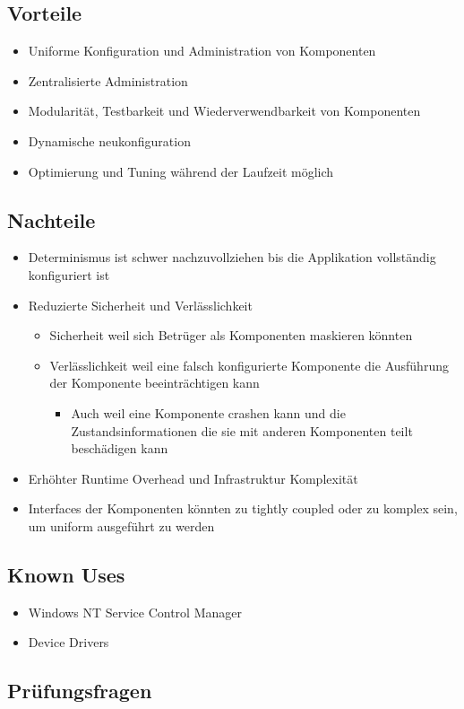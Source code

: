 \subsection{Vorteile}

\begin{itemize}
	\item Uniforme Konfiguration und Administration von Komponenten
	\item Zentralisierte Administration
	\item Modularität, Testbarkeit und Wiederverwendbarkeit von Komponenten
	\item Dynamische neukonfiguration
	\item Optimierung und Tuning während der Laufzeit möglich
\end{itemize}

\subsection{Nachteile}

\begin{itemize}
	\item Determinismus ist schwer nachzuvollziehen bis die Applikation vollständig konfiguriert ist
	\item Reduzierte Sicherheit und Verlässlichkeit
	\begin{itemize}
		\item Sicherheit weil sich Betrüger als Komponenten maskieren könnten
		\item Verlässlichkeit weil eine falsch konfigurierte Komponente die Ausführung der Komponente beeinträchtigen kann
		\begin{itemize}
			\item Auch weil eine Komponente crashen kann und die Zustandsinformationen die sie mit anderen Komponenten teilt beschädigen kann
		\end{itemize}
	\end{itemize}
	\item Erhöhter Runtime Overhead und Infrastruktur Komplexität
	\item Interfaces der Komponenten könnten zu tightly coupled oder zu komplex sein, um uniform ausgeführt zu werden
\end{itemize}

\subsection{Known Uses}

\begin{itemize}
	\item Windows NT Service Control Manager
	\item Device Drivers
\end{itemize}

\subsection{Prüfungsfragen}




